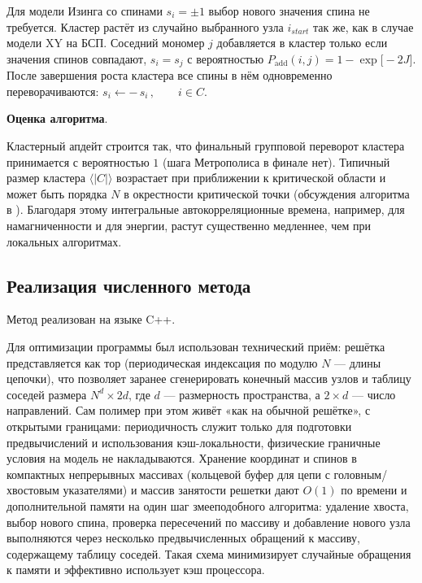 Для модели Изинга со спинами $s_i=\pm 1 $ выбор  нового значения спина не требуется.
Кластер растёт из случайно выбранного узла $i_{start}$ так же, как в случае модели XY на БСП. Соседний мономер $j$ добавляется в кластер 
только если значения спинов  совпадают, $s_i=s_j$ с вероятностью $P_{\text{add}}(i,j)=1-\exp\!\bigl[-2  J \bigr]$. 
После завершения роста кластера все спины в нём одновременно переворачиваются:
 $ s_i \leftarrow -\,s_i\,,\qquad i\in C$.


 \textbf{Оценка алгоритма}.   
 
 
 Кластерный апдейт строится так, что финальный групповой переворот кластера принимается с вероятностью $1$ (шага Метрополиса  в финале нет). 
 Типичный размер кластера $\langle\lvert C\rvert\rangle$ возрастает при приближении к критической области и может быть порядка $N$ в окрестности критической точки (обсуждения алгоритма в  \cite{Barkema}).
 Благодаря этому интегральные автокорреляционные времена, например, для намагниченности и  для энергии, растут существенно медленнее, чем при локальных алгоритмах. 
 


\subsection{Реализация численного метода}
\label{implementation}

Метод реализован на языке C++. 

Для оптимизации программы был использован технический приём: решётка представляется как тор (периодическая индексация по модулю $N$ --- длины цепочки), что позволяет заранее сгенерировать конечный массив узлов и таблицу соседей размера $N^d \times 2d$, где $d$ --- размерность пространства, а $2 \times d$ --- число направлений.
 Сам полимер при этом живёт «как на обычной решётке», с открытыми границами: периодичность служит только для подготовки предвычислений  и использования  кэш-локальности, физические граничные условия на модель не накладываются. 
Хранение координат и спинов в компактных непрерывных массивах (кольцевой буфер для цепи с головным/хвостовым указателями) и массив занятости решетки дают  $O(1)$ по времени и дополнительной памяти на один шаг змееподобного алгоритма: удаление хвоста, выбор нового спина, проверка пересечений по массиву и добавление нового узла  выполняются через несколько предвычисленных обращений к массиву, содержащему таблицу соседей. 
Такая схема минимизирует случайные обращения к памяти и эффективно использует кэш процессора.

